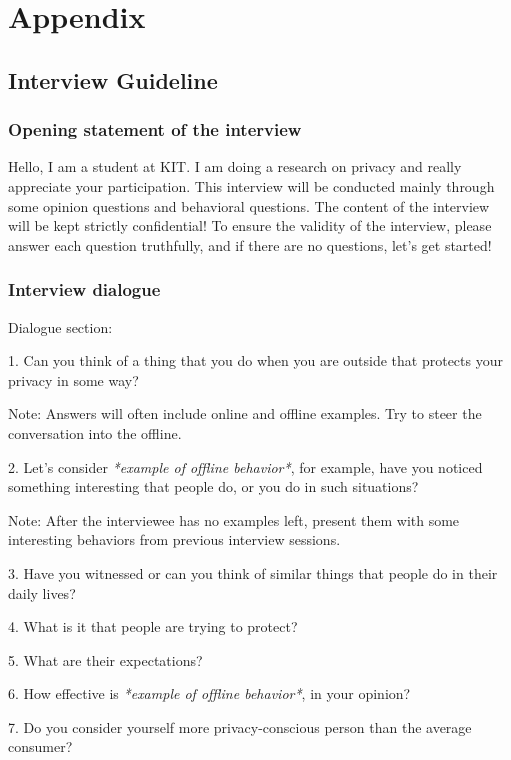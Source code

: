 \section{Appendix}
\label{appendix}

\subsection{Interview Guideline}
\label{interview_guide}

\subsubsection{Opening statement of the interview} 

Hello, I am a student at KIT. I am doing a research on privacy and  really appreciate your participation. This interview will be conducted mainly through some opinion questions and behavioral questions. The content of the interview will be kept strictly confidential! To ensure the validity of the interview, please answer each question truthfully, and if there are no questions, let's get started! 

\subsubsection{Interview dialogue}

Dialogue section:
\begin{addmargin}[4em]{1em}
    
1. Can you think of a thing that you do when you are outside that protects your privacy in some way?

Note: Answers will often include online and offline examples. Try to steer the conversation into the offline.

2. Let's consider \textit{*example of offline behavior*}, for example, have you noticed something interesting that people do, or you do in such situations?

Note: After the interviewee has no examples left, present them with some interesting behaviors from previous interview sessions.

3. Have you witnessed or can you think of similar things that people do in their daily lives?

4. What is it that people are trying to protect?

5. What are their expectations?

6. How effective is \textit{*example of offline behavior*}, in your opinion?

7. Do you consider yourself more privacy-conscious person than the average consumer?   
\end{addmargin}

